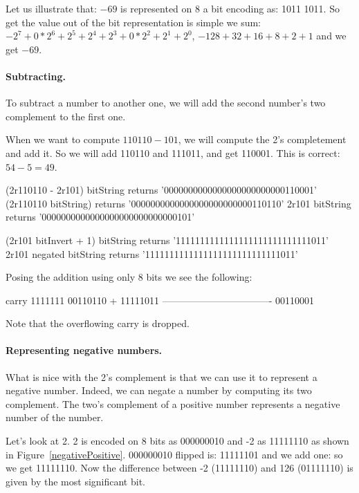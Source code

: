 \documentclass[a4paper,10pt,twoside]{book}
\begin{document}
Let us illustrate that: 
$-69$ is represented on 8 a bit encoding as: 1011 1011. So get the value out of the bit representation is simple we sum: $-2^7 + 0*2^6 + 2^5 + 2^4 + 2^3 + 0*2^2 + 2^1 + 2^0$, \ie $-128 + 32 + 16 + 8 + 2 + 1$ and we get $-69$. 


\paragraph{Subtracting.}
To subtract a number to another one, we will add the second number's two complement to the first one.

When we want to compute $110110 - 101$, we will compute the 2's completement and add it. 
So we will add 110110 and 111011, and get 110001. This is correct: $54 - 5 = 49$.

\begin{code}{}
(2r110110 - 2r101) bitString	
	returns '0000000000000000000000000110001'
(2r110110 bitString) 	
	returns '0000000000000000000000000110110'
2r101 bitString
	returns '0000000000000000000000000000101'		
							
(2r101 bitInvert + 1) bitString
	returns '1111111111111111111111111111011'	
2r101 negated bitString
	returns '1111111111111111111111111111011'	
\end{code}
	
Posing the addition using only 8 bits we see the following:

\begin{code}{}
carry	1111111 
		 00110110
+		 11111011	
	----------------------------------
		 00110001	
\end{code}

Note that the overflowing carry is dropped.

\paragraph{Representing negative numbers.}
What is nice with the 2's complement is that we can use it to represent a negative number. Indeed, we can negate a number by computing its two complement. The two's complement of a positive number represents a negative number of the number.

Let's look at 2. 2 is encoded on 8 bits as 000000010 and -2 as 11111110 as shown in Figure~\ref{negativePositive}.
000000010 flipped is: 11111101 and we add one: so we get 11111110.
Now the difference between  -2 (11111110) and 126 (01111110) is given by the most significant bit. 
\end{document}
